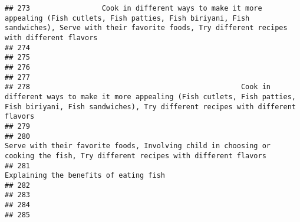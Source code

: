 \documentclass[
]{article}
\begin{document}
\begin{verbatim}
## 273                 Cook in different ways to make it more appealing (Fish cutlets, Fish patties, Fish biriyani, Fish sandwiches), Serve with their favorite foods, Try different recipes with different flavors
## 274                                                                                                                                                                                                             
## 275                                                                                                                                                                                                             
## 276                                                                                                                                                                                                             
## 277                                                                                                                                                                                                             
## 278                                                  Cook in different ways to make it more appealing (Fish cutlets, Fish patties, Fish biriyani, Fish sandwiches), Try different recipes with different flavors
## 279                                                                                                                                                                                                             
## 280                                                                               Serve with their favorite foods, Involving child in choosing or cooking the fish, Try different recipes with different flavors
## 281                                                                                                                                                                       Explaining the benefits of eating fish
## 282                                                                                                                                                                                                             
## 283                                                                                                                                                                                                             
## 284                                                                                                                                                                                                             
## 285                                                                                                                                                                                                             

\end{verbatim}
\end{document}
